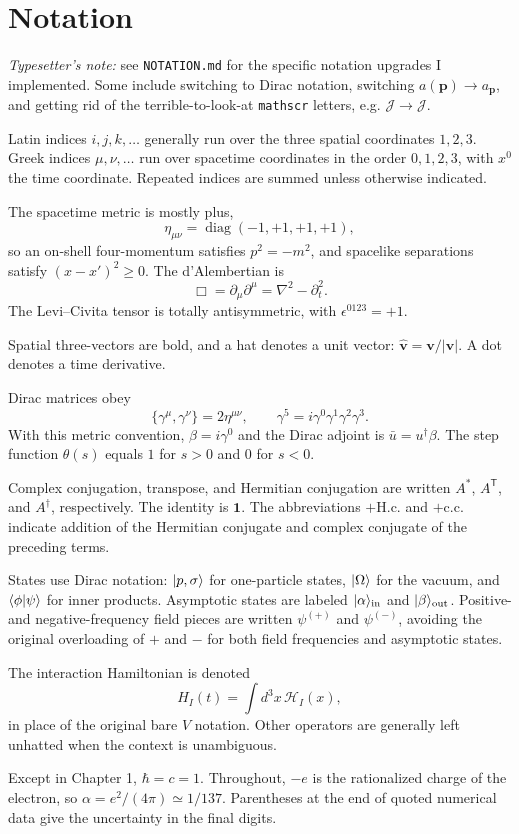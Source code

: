 \section*{Notation}

\emph{Typesetter's note:} see \verb|NOTATION.md| for the specific notation
upgrades I implemented. Some include switching to Dirac notation, switching
$a(\mathbf{p}) \to a_{\mathbf{p}}$, and getting rid of the terrible-to-look-at
\verb|mathscr| letters, e.g. $\mathscr{J} \to \mathcal{J}$.

Latin indices $i,j,k,\ldots$ generally run over the three spatial coordinates
$1,2,3$. Greek indices $\mu,\nu,\ldots$ run over spacetime coordinates in the
order $0,1,2,3$, with $x^0$ the time coordinate. Repeated indices are summed
unless otherwise indicated.

The spacetime metric is mostly plus,
\[
  \eta_{\mu\nu}=\operatorname{diag}(-1,+1,+1,+1),
\]
so an on-shell four-momentum satisfies $p^2=-m^2$, and spacelike separations
satisfy $(x-x')^2\geq 0$. The d'Alembertian is
\[
  \Box=\partial_\mu\partial^\mu=\nabla^2-\partial_t^2.
\]
The Levi--Civita tensor is totally antisymmetric, with
$\epsilon^{0123}=+1$.

Spatial three-vectors are bold, and a hat denotes a unit vector:
$\widehat{\mathbf v}=\mathbf v/\lvert\mathbf v\rvert$. A dot denotes a time
derivative.

Dirac matrices obey
\[
  \{\gamma^\mu,\gamma^\nu\}=2\eta^{\mu\nu},
  \qquad
  \gamma^5=i\gamma^0\gamma^1\gamma^2\gamma^3.
\]
With this metric convention, $\beta=i\gamma^0$ and the Dirac adjoint is
$\bar u=u^\dagger\beta$. The step function $\theta(s)$ equals $1$ for $s>0$
and $0$ for $s<0$.

Complex conjugation, transpose, and Hermitian conjugation are written $A^*$,
$A^{\mathsf T}$, and $A^\dagger$, respectively. The identity is $\mathbf{1}$.
The abbreviations $+\mathrm{H.c.}$ and $+\mathrm{c.c.}$ indicate addition of the
Hermitian conjugate and complex conjugate of the preceding terms.

States use Dirac notation: $\lvert p,\sigma\rangle$ for one-particle states,
$\lvert \Omega\rangle$ for the vacuum, and $\langle \phi | \psi\rangle$ for inner products.
Asymptotic states are labeled $\lvert \alpha\rangle_{\mathrm{in}}$ and
$\lvert \beta\rangle_{\mathrm{out}}$. Positive- and negative-frequency field pieces
are written $\psi^{(+)}$ and $\psi^{(-)}$, avoiding the original overloading of
$+$ and $-$ for both field frequencies and asymptotic states.

The interaction Hamiltonian is denoted
\[
  H_I(t)=\int d^3x\,\mathcal H_I(x),
\]
in place of the original bare $V$ notation. Other operators are generally left
unhatted when the context is unambiguous.

Except in Chapter 1, $\hbar=c=1$. Throughout, $-e$ is the rationalized charge
of the electron, so $\alpha=e^2/(4\pi)\simeq 1/137$. Parentheses at the end of
quoted numerical data give the uncertainty in the final digits.
